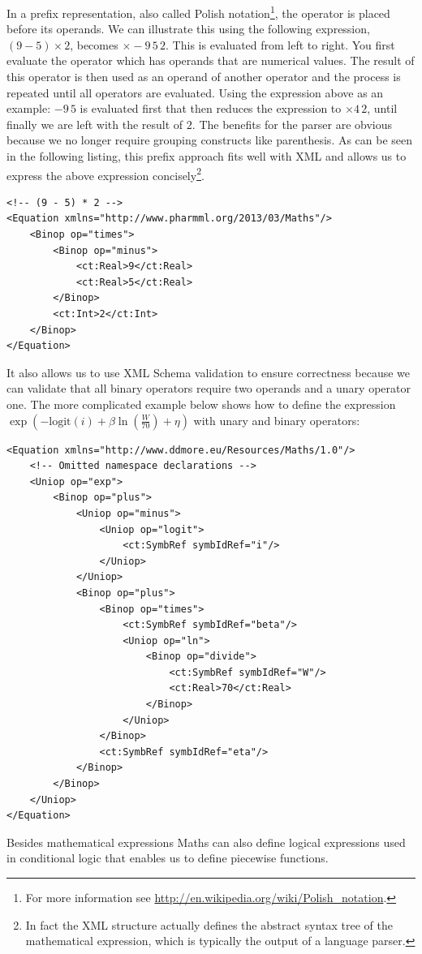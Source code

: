 In a prefix representation, also called Polish notation\footnote{For
  more information see
  \url{http://en.wikipedia.org/wiki/Polish_notation}.}, the operator is
placed before its operands. We can illustrate this using the following
expression, $(9 - 5) \times 2$, becomes $\times-9\,5\,2$. This is
evaluated from left to right. You first evaluate the operator which
has operands that are numerical values. The result of this operator is
then used as an operand of another operator and the process is
repeated until all operators are evaluated. Using the expression above
as an example: $-9\,5$ is evaluated first that then reduces the
expression to $\times 4\,2$, until finally we are left with the result
of $2$. The benefits for the parser are obvious because we no longer
require grouping constructs like parenthesis. As can be seen in the
following listing, this prefix approach fits well with XML and allows
us to express the above expression concisely\footnote{In fact the XML
  structure actually defines the abstract syntax tree of the
  mathematical expression, which is typically the output of a language
  parser.}.
%
\lstset{language=XML}
\begin{lstlisting}
<!-- (9 - 5) * 2 -->
<Equation xmlns="http://www.pharmml.org/2013/03/Maths"/>
    <Binop op="times">
        <Binop op="minus">
            <ct:Real>9</ct:Real>
            <ct:Real>5</ct:Real>
        </Binop>
        <ct:Int>2</ct:Int>
    </Binop>
</Equation>
\end{lstlisting}
%
It also allows us to use XML Schema validation to ensure correctness
because we can validate that all binary operators require two operands
and a unary operator one. The more complicated example below shows how
to define the expression $\exp\left(-\textrm{logit}(i) + \beta
  \ln\left(\frac{W}{70}\right)+\eta\right)$ with unary and binary
operators:
%
\lstset{language=XML}
\begin{lstlisting}
<Equation xmlns="http://www.ddmore.eu/Resources/Maths/1.0"/>
    <!-- Omitted namespace declarations -->
    <Uniop op="exp">
        <Binop op="plus">
            <Uniop op="minus">
                <Uniop op="logit">
                    <ct:SymbRef symbIdRef="i"/>
                </Uniop>
            </Uniop>
            <Binop op="plus">
                <Binop op="times">
                    <ct:SymbRef symbIdRef="beta"/>
                    <Uniop op="ln">
                        <Binop op="divide">
                            <ct:SymbRef symbIdRef="W"/>
                            <ct:Real>70</ct:Real>
                        </Binop>
                    </Uniop>
                </Binop>
                <ct:SymbRef symbIdRef="eta"/>
            </Binop>
        </Binop>
    </Uniop>
</Equation>
\end{lstlisting}
%
Besides mathematical expressions \pharmml Maths can also define logical
expressions used in conditional logic that enables us to define
piecewise functions. %

